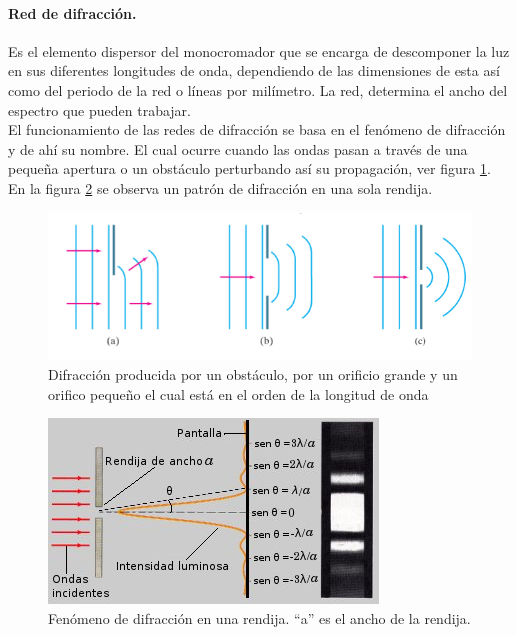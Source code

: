 \paragraph{Red de difracción.} Es el elemento dispersor del monocromador que se encarga de descomponer la luz en sus diferentes longitudes de onda, dependiendo de las dimensiones de esta así como del periodo de la red o líneas por milímetro. La red, determina el ancho del espectro que pueden trabajar.\\ 
El funcionamiento de las redes de difracción se basa en el fenómeno de difracción y de ahí su nombre. El cual ocurre cuando las ondas pasan a través de una pequeña apertura o un obstáculo perturbando así su propagación, ver figura \ref{fig:difraccion}. En la figura \ref{fig:slit2} se observa un patrón de difracción en una sola rendija.
\begin{figure}[h]
	\centering
	\includegraphics[width=0.9\linewidth]{Imagenes/difraccion}
	\caption{Difracción producida por un obstáculo, por un orificio grande y un orifico pequeño el cual está en el orden de la longitud de onda \cite{Oliver2013a}} %
	\label{fig:difraccion}
\end{figure}
\begin{figure}[h]
	\centering
	\includegraphics[width=0.7\linewidth]{Imagenes/patronrendijasimple}
	\caption{Fenómeno de difracción en una rendija. ``a'' es el ancho de la rendija. \cite{longitud01}}
	\label{fig:slit2}
\end{figure} 

